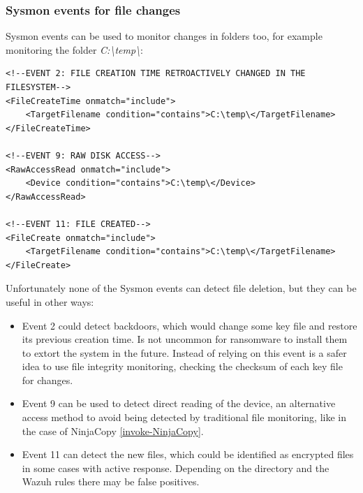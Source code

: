 \subsubsection{Sysmon events for file changes}
Sysmon events can be used to monitor changes in folders too, for example monitoring the folder \textit{C:{\textbackslash}temp{\textbackslash}}:
\begin{lstlisting}[style=xml]
<!--EVENT 2: FILE CREATION TIME RETROACTIVELY CHANGED IN THE FILESYSTEM-->
<FileCreateTime onmatch="include">
	<TargetFilename condition="contains">C:\temp\</TargetFilename>
</FileCreateTime>

<!--EVENT 9: RAW DISK ACCESS-->
<RawAccessRead onmatch="include">
	<Device condition="contains">C:\temp\</Device>
</RawAccessRead>

<!--EVENT 11: FILE CREATED-->
<FileCreate onmatch="include">
	<TargetFilename condition="contains">C:\temp\</TargetFilename>
</FileCreate>
\end{lstlisting}
\linej
Unfortunately none of the Sysmon events can detect file deletion, but they can be useful in other ways:
\begin{itemize}
	\item Event 2 could detect backdoors, which would change some key file and restore its previous creation time. Is not uncommon for ransomware to install them to extort the system in the future. Instead of relying on this event is a safer idea to use file integrity monitoring, checking the checksum of each key file for changes.
	\item Event 9 can be used to detect direct reading of the device, an alternative access method to avoid being detected by traditional file monitoring, like in the case of NinjaCopy \ref{invoke-NinjaCopy}.
	\item Event 11 can detect the new files, which could be identified as encrypted files in some cases with active response. Depending on the directory and the Wazuh rules there may be false positives.
\end{itemize}

